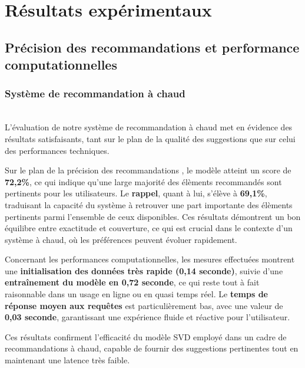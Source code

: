 \documentclass{article}
\begin{document}
\section{Résultats expérimentaux}

\subsection{Précision des recommandations et performance computationnelles}

\subsubsection{Système de recommandation à chaud}
$ $\\
L’évaluation de notre système de recommandation à chaud met en évidence des résultats satisfaisants, tant sur le plan de la qualité des suggestions que sur celui des performances techniques.

Sur le plan de la précision des recommandations , le modèle atteint un score de \textbf{72,2\%}, ce qui indique qu’une large majorité des élèments recommandés sont pertinents pour les utilisateurs. Le \textbf{rappel}, quant à lui, s’élève à \textbf{69,1\%}, traduisant la capacité du système à retrouver une part importante des élèments pertinents parmi l’ensemble de ceux disponibles. Ces résultats démontrent un bon équilibre entre exactitude et couverture, ce qui est crucial dans le contexte d’un système à chaud, où les préférences peuvent évoluer rapidement.

Concernant les performances computationnelles, les mesures effectuées montrent une \textbf{initialisation des données très rapide (0,14 seconde)}, suivie d’une \textbf{entraînement du modèle en 0,72 seconde}, ce qui reste tout à fait raisonnable dans un usage en ligne ou en quasi temps réel. Le \textbf{temps de réponse moyen aux requêtes} est particulièrement bas, avec une valeur de \textbf{0,03 seconde}, garantissant une expérience fluide et réactive pour l’utilisateur.

Ces résultats confirment l’efficacité du modèle SVD employé dans un cadre de recommandations à chaud, capable de fournir des suggestions pertinentes tout en maintenant une latence très faible.
\end{document}
